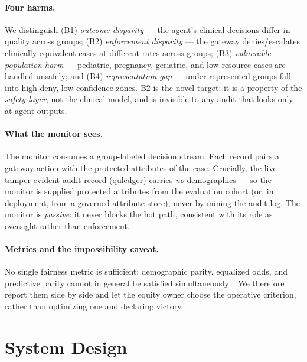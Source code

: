 \documentclass[11pt]{article}
\begin{document}
\paragraph{Four harms.} We distinguish (B1) \emph{outcome disparity} --- the agent's
clinical decisions differ in quality across groups; (B2) \emph{enforcement
disparity} --- the gateway denies/escalates clinically-equivalent cases at
different rates across groups; (B3) \emph{vulnerable-population harm} --- pediatric,
pregnancy, geriatric, and low-resource cases are handled unsafely; and (B4)
\emph{representation gap} --- under-represented groups fall into high-deny,
low-confidence zones. B2 is the novel target: it is a property of the \emph{safety
layer}, not the clinical model, and is invisible to any audit that looks only at
agent outputs.

\paragraph{What the monitor sees.} The monitor consumes a group-labeled decision
stream. Each record pairs a gateway action with the protected attributes of the
case. Crucially, the live tamper-evident audit record (quledger) carries
\emph{no} demographics --- so the monitor is supplied protected attributes from the
evaluation cohort (or, in deployment, from a governed attribute store), never by
mining the audit log. The monitor is \emph{passive}: it never blocks the hot path,
consistent with its role as oversight rather than enforcement.

\paragraph{Metrics and the impossibility caveat.} No single fairness metric is
sufficient; demographic parity, equalized odds, and predictive parity cannot in
general be satisfied simultaneously~\cite{chouldechova2017,kleinberg2017}. We
therefore report them side by side and let the equity owner choose the operative
criterion, rather than optimizing one and declaring victory.

\section{System Design}
\end{document}
